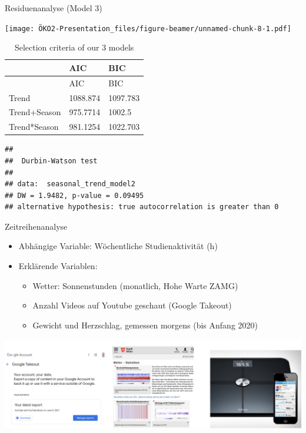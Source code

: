 \documentclass[
  ignorenonframetext,
]{beamer}
\begin{document}
\begin{frame}
\begin{block}{Residuenanalyse (Model 3)}
\protect\hypertarget{residuenanalyse-model-3}{}
\hfill\break

\texttt{[image: ÖKO2-Presentation\_files/figure-beamer/unnamed-chunk-8-1.pdf]}
\end{block}
\end{frame}

\begin{frame}[fragile]
\begin{longtable}[]{@{}lll@{}}
\caption{Selection criteria of our 3 models}\tabularnewline
\toprule
& AIC & BIC \\
\midrule
\endfirsthead
\toprule
& AIC & BIC \\
\midrule
\endhead
Trend & 1088.874 & 1097.783 \\
Trend+Season & 975.7714 & 1002.5 \\
Trend*Season & 981.1254 & 1022.703 \\
\bottomrule
\end{longtable}

\begin{verbatim}
## 
##  Durbin-Watson test
## 
## data:  seasonal_trend_model2
## DW = 1.9482, p-value = 0.09495
## alternative hypothesis: true autocorrelation is greater than 0
\end{verbatim}
\end{frame}

\begin{frame}{Zeitreihenanalyse}
\protect\hypertarget{zeitreihenanalyse-1}{}
\begin{itemize}
\item
  Abhängige Variable: Wöchentliche Studienaktivität (h)
\item
  Erklärende Variablen:

  \begin{itemize}
  \item
    Wetter: Sonnenstunden (monatlich, Hohe Warte ZAMG)
  \item
    Anzahl Videos auf Youtube geschaut (Google Takeout)
  \item
    Gewicht und Herzschlag, gemessen morgens (bis Anfang 2020)
  \end{itemize}
\end{itemize}

\includegraphics{images/x.png}
\end{frame}
\end{document}
